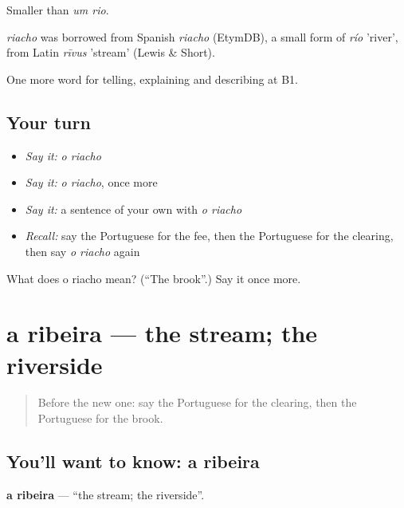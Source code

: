 Smaller than \emph{um rio}.

\begin{cousinweb}
\emph{riacho} was borrowed from Spanish \emph{riacho} (EtymDB), a small form of \emph{río} 'river', from Latin \emph{rīvus} 'stream' (Lewis \& Short).
\end{cousinweb}

\begin{grammarlens}[title={What you've built}]
One more word for telling, explaining and describing at B1.
\end{grammarlens}

\subsection*{Your turn}
\begin{itemize}
\raggedright
  \item \emph{Say it:} \emph{o riacho}
  \item \emph{Say it:} \emph{o riacho}, once more
  \item \emph{Say it:} a sentence of your own with \emph{o riacho}
  \item \emph{Recall:} say the Portuguese for the fee, then the Portuguese for the clearing, then say \emph{o riacho} again
\end{itemize}

\begin{tcolorbox}[breakable,colback=teal!4,colframe=teal!35!black,title={Before you move on}]
What does o riacho mean? (\textquotedblleft{}The brook\textquotedblright{}.) Say it once more.
\end{tcolorbox}
\section[a ribeira]{a ribeira — the stream; the riverside}

\label{lesson:PT-C456-ribeira}



\begin{quote}
Before the new one: say the Portuguese for the clearing, then the Portuguese for the brook.
\end{quote}

\subsection*{You'll want to know: a ribeira}
\textbf{a ribeira} — \textquotedblleft{}the stream; the riverside\textquotedblright{}.

